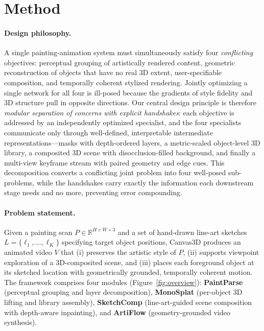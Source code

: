 \section{Method}
\label{sec:method}

\paragraph{Design philosophy.}
A single painting-animation system must simultaneously satisfy four
\emph{conflicting} objectives: perceptual grouping of artistically rendered
content, geometric reconstruction of objects that have no real 3D extent,
user-specifiable composition, and temporally coherent stylized rendering.
Jointly optimizing a single network for all four is ill-posed because the
gradients of style fidelity and 3D structure pull in opposite directions.
Our central design principle is therefore \emph{modular separation of
concerns with explicit handshakes}: each objective is addressed by an
independently optimized specialist, and the four specialists communicate
only through well-defined, interpretable intermediate
representations---masks with depth-ordered layers, a metric-scaled
object-level 3D library, a composited 3D scene with disocclusion-filled
background, and finally a multi-view keyframe stream with paired
geometry and edge cues. This decomposition converts a conflicting joint
problem into four well-posed sub-problems, while the handshakes carry
exactly the information each downstream stage needs and no more,
preventing error compounding.

\paragraph{Problem statement.}
Given a painting scan $P \in \mathbb{R}^{H\times W \times 3}$ and a set of
hand-drawn line-art sketches $L = \{\ell_1, \dots, \ell_K\}$ specifying
target object positions, Canvas3D produces an animated video $V$ that
(i) preserves the artistic style of $P$, (ii) supports viewpoint
exploration of a 3D-composited scene, and (iii) places each foreground
object at its sketched location with geometrically grounded, temporally
coherent motion. The framework comprises four modules
(Figure~\ref{fig:overview}): \textbf{PaintParse} (perceptual grouping and
layer decomposition), \textbf{MonoSplat} (per-object 3D lifting and
library assembly), \textbf{SketchComp} (line-art-guided scene composition
with depth-aware inpainting), and \textbf{ArtiFlow} (geometry-grounded
video synthesis).

